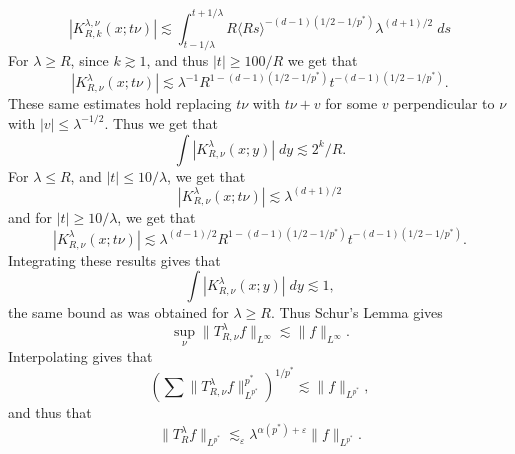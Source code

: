 %
\[ |K^{\lambda,\nu}_{R,k}(x;t\nu)| \lesssim \int_{t - 1/\lambda}^{t + 1/\lambda} R \langle Rs \rangle^{-(d-1)(1/2 - 1/p^*)} \lambda^{(d+1)/2} \; ds \]
%
For $\lambda \geq R$, since $k \gtrsim 1$, and thus $|t| \geq 100/R$ we get that
%
\[ |K^\lambda_{R,\nu}(x;t\nu)| \lesssim \lambda^{-1} R^{1 - (d-1)(1/2 - 1/p^*)} t^{- (d-1)(1/2 - 1/p^*)}. \]
%
These same estimates hold replacing $t \nu$ with $t \nu + v$ for some $v$ perpendicular to $\nu$ with $|v| \leq \lambda^{-1/2}$. Thus we get that
%
\[ \int |K^\lambda_{R,\nu}(x;y)|\; dy \lesssim 2^k/R. \]
%
For $\lambda \leq R$, and $|t| \leq 10/\lambda$, we get that
%
\[ |K^\lambda_{R,\nu}(x;t\nu)| \lesssim \lambda^{(d+1)/2} \]
%
and for $|t| \geq 10/\lambda$, we get that
%
\[ |K^\lambda_{R,\nu}(x;t\nu)| \lesssim \lambda^{(d-1)/2} R^{1 - (d-1)(1/2-1/p^*)} t^{-(d-1)(1/2-1/p^*)}. \]
%
Integrating these results gives that
%
\[ \int |K^\lambda_{R,\nu}(x;y)|\; dy \lesssim 1, \]
%
the same bound as was obtained for $\lambda \geq R$. Thus Schur's Lemma gives
%
\[ \sup_\nu \| T^\lambda_{R,\nu} f \|_{L^\infty} \lesssim \| f \|_{L^\infty}. \]
%
%
%
%
%
Interpolating gives that
%
\[ \left( \sum \| T^\lambda_{R,\nu} f \|_{L^{p^*}}^{p^*} \right)^{1/p^*} \lesssim \| f \|_{L^{p^*}}, \]
%
and thus that
%
\[ \| T^\lambda_R f \|_{L^{p^*}} \lesssim_\varepsilon \lambda^{\alpha(p^*) + \varepsilon} \| f \|_{L^{p^*}}. \]








